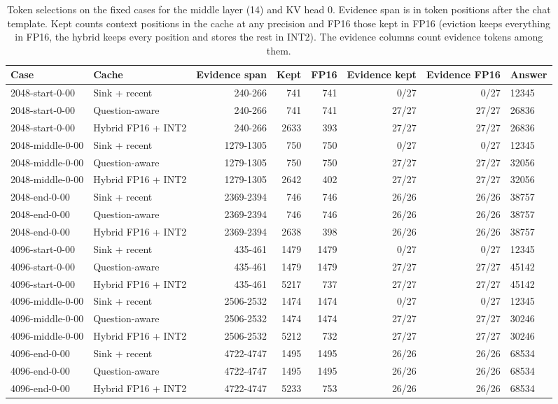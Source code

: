\begin{table}[!htb]
\centering
\scriptsize
\setlength{\tabcolsep}{3.5pt}
\caption{Token selections on the fixed cases for the middle layer (14) and KV head 0. Evidence span is in token positions after the chat template. Kept counts context positions in the cache at any precision and FP16 those kept in FP16 (eviction keeps everything in FP16, the hybrid keeps every position and stores the rest in INT2). The evidence columns count evidence tokens among them.}
\label{tab:t2cmasks}
\begin{adjustbox}{max width=\linewidth}
\begin{tabular}{llrrrrrl}
\toprule
Case & Cache & Evidence span & Kept & FP16 & Evidence kept & Evidence FP16 & Answer \\
\midrule
2048-start-0-00 & Sink + recent & 240-266 & 741 & 741 & 0/27 & 0/27 & 12345 \\
2048-start-0-00 & Question-aware & 240-266 & 741 & 741 & 27/27 & 27/27 & 26836 \\
2048-start-0-00 & Hybrid FP16 + INT2 & 240-266 & 2633 & 393 & 27/27 & 27/27 & 26836 \\
2048-middle-0-00 & Sink + recent & 1279-1305 & 750 & 750 & 0/27 & 0/27 & 12345 \\
2048-middle-0-00 & Question-aware & 1279-1305 & 750 & 750 & 27/27 & 27/27 & 32056 \\
2048-middle-0-00 & Hybrid FP16 + INT2 & 1279-1305 & 2642 & 402 & 27/27 & 27/27 & 32056 \\
2048-end-0-00 & Sink + recent & 2369-2394 & 746 & 746 & 26/26 & 26/26 & 38757 \\
2048-end-0-00 & Question-aware & 2369-2394 & 746 & 746 & 26/26 & 26/26 & 38757 \\
2048-end-0-00 & Hybrid FP16 + INT2 & 2369-2394 & 2638 & 398 & 26/26 & 26/26 & 38757 \\
4096-start-0-00 & Sink + recent & 435-461 & 1479 & 1479 & 0/27 & 0/27 & 12345 \\
4096-start-0-00 & Question-aware & 435-461 & 1479 & 1479 & 27/27 & 27/27 & 45142 \\
4096-start-0-00 & Hybrid FP16 + INT2 & 435-461 & 5217 & 737 & 27/27 & 27/27 & 45142 \\
4096-middle-0-00 & Sink + recent & 2506-2532 & 1474 & 1474 & 0/27 & 0/27 & 12345 \\
4096-middle-0-00 & Question-aware & 2506-2532 & 1474 & 1474 & 27/27 & 27/27 & 30246 \\
4096-middle-0-00 & Hybrid FP16 + INT2 & 2506-2532 & 5212 & 732 & 27/27 & 27/27 & 30246 \\
4096-end-0-00 & Sink + recent & 4722-4747 & 1495 & 1495 & 26/26 & 26/26 & 68534 \\
4096-end-0-00 & Question-aware & 4722-4747 & 1495 & 1495 & 26/26 & 26/26 & 68534 \\
4096-end-0-00 & Hybrid FP16 + INT2 & 4722-4747 & 5233 & 753 & 26/26 & 26/26 & 68534 \\
\bottomrule
\end{tabular}
\end{adjustbox}
\end{table}
